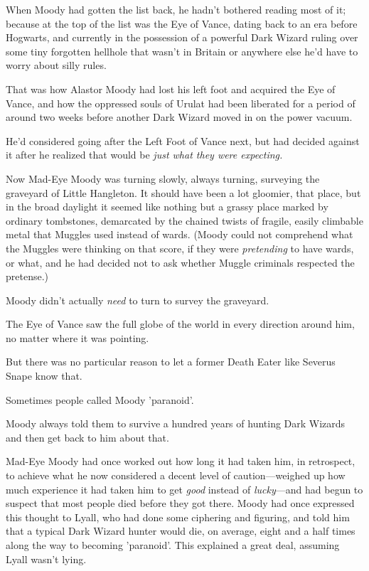 When Moody had gotten the list back, he hadn't bothered reading most of it; 
because at the top of the list was the Eye of Vance, dating back to an era 
before Hogwarts, and currently in the possession of a powerful Dark Wizard 
ruling over some tiny forgotten hellhole that wasn't in Britain or anywhere 
else he'd have to worry about silly rules.

That was how Alastor Moody had lost his left foot and acquired the Eye of 
Vance, and how the oppressed souls of Urulat had been liberated for a period of 
around two weeks before another Dark Wizard moved in on the power vacuum.

He'd considered going after the Left Foot of Vance next, but had decided 
against it after he realized that would be \emph{just what they were expecting.}

Now Mad-Eye Moody was turning slowly, always turning, surveying the graveyard 
of Little Hangleton. It should have been a lot gloomier, that place, but in the 
broad daylight it seemed like nothing but a grassy place marked by ordinary 
tombstones, demarcated by the chained twists of fragile, easily climbable metal 
that Muggles used instead of wards. (Moody could not comprehend what the 
Muggles were thinking on that score, if they were \emph{pretending} to have 
wards, or what, and he had decided not to ask whether Muggle criminals 
respected the pretense.)

Moody didn't actually \emph{need} to turn to survey the graveyard.

The Eye of Vance saw the full globe of the world in every direction around him, 
no matter where it was pointing.

But there was no particular reason to let a former Death Eater like Severus 
Snape know that.

Sometimes people called Moody 'paranoid'.

Moody always told them to survive a hundred years of hunting Dark Wizards and 
then get back to him about that.

Mad-Eye Moody had once worked out how long it had taken him, in retrospect, to 
achieve what he now considered a decent level of caution---weighed up how much 
experience it had taken him to get \emph{good} instead of \emph{lucky}---and 
had begun to suspect that most people died before they got there. Moody had 
once expressed this thought to Lyall, who had done some ciphering and figuring, 
and told him that a typical Dark Wizard hunter would die, on average, eight and 
a half times along the way to becoming 'paranoid'. This explained a great deal, 
assuming Lyall wasn't lying.

